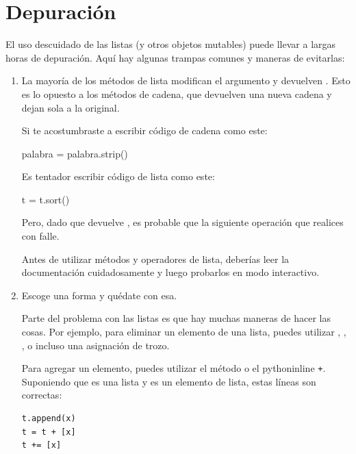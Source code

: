 \section{Depuración}

El uso descuidado de las listas (y otros objetos mutables)
puede llevar a largas horas de depuración.  Aquí hay algunas
trampas comunes y maneras de evitarlas:

\begin{enumerate}

\item La mayoría de los métodos de lista modifican el argumento y
  devuelven . Esto es lo opuesto a los métodos de cadena,
  que devuelven una nueva cadena y dejan sola a la original.

Si te acostumbraste a escribir código de cadena como este:

\begin{python}[frame=single]
palabra = palabra.strip()
\end{python}

Es tentador escribir código de lista como este:

\begin{python}[frame=single]
t = t.sort()           
\end{python}

Pero, dado que  devuelve , es probable que la
siguiente operación que realices con  falle.

Antes de utilizar métodos y operadores de lista, deberías leer la
documentación cuidadosamente y luego probarlos en modo interactivo.

\item Escoge una forma y quédate con esa.

Parte del problema con las listas es que hay muchas
maneras de hacer las cosas.  Por ejemplo, para eliminar un elemento de
una lista, puedes utilizar , , ,
o incluso una asignación de trozo.

Para agregar un elemento, puedes utilizar el método  o
el pythoninline \texttt{+}.  Suponiendo que  es una lista y
 es un elemento de lista, estas líneas son correctas:

\begin{Verbatim}[frame=single]
t.append(x)
t = t + [x]
t += [x]
\end{Verbatim}


\end{enumerate}
